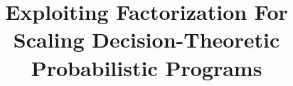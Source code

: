 \documentclass[acmsmall,review]{acmart}\settopmatter{printfolios=true,printccs=false,printacmref=false}
\begin{document}
\title{Exploiting Factorization For Scaling Decision-Theoretic Probabilistic Programs}         %




\end{document}

